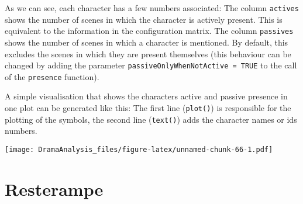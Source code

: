 \documentclass[]{book}
\newenvironment{Shaded}{\begin{snugshade}}{\end{snugshade}}
\newcommand{\DataTypeTok}[1]{\textcolor[rgb]{0.13,0.29,0.53}{#1}}
\newcommand{\DecValTok}[1]{\textcolor[rgb]{0.00,0.00,0.81}{#1}}
\newcommand{\KeywordTok}[1]{\textcolor[rgb]{0.13,0.29,0.53}{\textbf{#1}}}
\newcommand{\NormalTok}[1]{#1}
\newcommand{\OperatorTok}[1]{\textcolor[rgb]{0.81,0.36,0.00}{\textbf{#1}}}
\newcommand{\StringTok}[1]{\textcolor[rgb]{0.31,0.60,0.02}{#1}}
\begin{document}
As we can see, each character has a few numbers associated: The column \texttt{actives} shows the number of scenes in which the character is actively present. This is equivalent to the information in the configuration matrix. The column \texttt{passives} shows the number of scenes in which a character is mentioned. By default, this excludes the scenes in which they are present themselves (this behaviour can be changed by adding the parameter \texttt{passiveOnlyWhenNotActive\ =\ TRUE} to the call of the \texttt{presence} function).

A simple visualisation that shows the characters active and passive presence in one plot can be generated like this: The first line (\texttt{plot()}) is responsible for the plotting of the symbols, the second line (\texttt{text()}) adds the character names or ids numbers.

\begin{Shaded}
\end{Shaded}

\texttt{[image: DramaAnalysis\_files/figure-latex/unnamed-chunk-66-1.pdf]}

\hypertarget{resterampe}{%
\chapter{Resterampe}\label{resterampe}}
\end{document}
